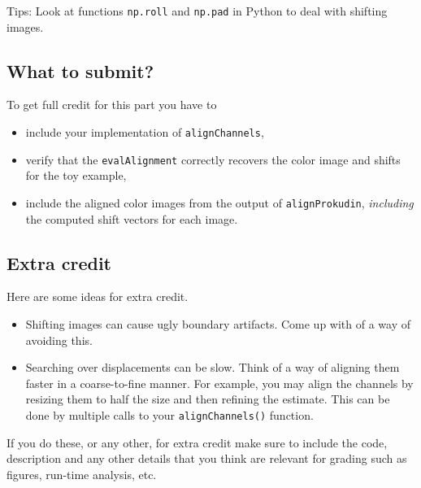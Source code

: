 \documentclass[10pt,letterpaper]{article}
\newcommand{\cmd}[1] {{\color{blue}\texttt{#1}}}
\begin{document}
Tips: Look at functions \cmd{np.roll} and \cmd{np.pad} in Python to deal with shifting images.


\subsection{What to submit?}
To get full credit for this part you have to 
\begin{itemize}
\item include your implementation of \cmd{alignChannels},
\item verify that the \cmd{evalAlignment} correctly recovers the color image and shifts for the toy example, 
\item include the aligned color images from the output of \cmd{alignProkudin},
\emph{including} the computed shift vectors for each image.
\end{itemize}

\subsection{Extra credit}
Here are some ideas for extra credit.
\begin{itemize}
\item Shifting images can cause ugly boundary artifacts. Come up with of a way of avoiding this.
\item Searching over displacements can be slow. Think of a way of aligning them faster in a coarse-to-fine manner. For example, you may align the channels by resizing them to half the size and then refining the estimate. This can be done by multiple calls to your \cmd{alignChannels()} function.
\end{itemize}
If you do these, or any other, for extra credit make sure to include the code, description and any other details that you think are relevant for grading such as figures, run-time analysis, etc.
\end{document}
